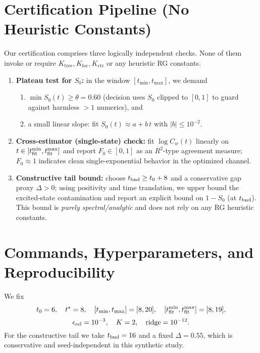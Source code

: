\documentclass[11pt]{article}
\newcommand{\Szero}{S_0}
\begin{document}
\section{Certification Pipeline (No Heuristic Constants)}

Our certification comprises three logically independent checks. None of them invoke or require $K_{\text{tree}},K_{\text{loc}},K_{\text{ctr}}$ or any heuristic RG constants.

\begin{enumerate}[leftmargin=2em]
\item \textbf{Plateau test for $\Szero$:} in the window $[t_{\min},t_{\max}]$, we demand
  \begin{enumerate}[label*=\arabic*.]
    \item $\min \Szero(t)\ge \theta=0.60$ (decision uses $\Szero$ clipped to $[0,1]$ to guard against harmless $>1$ numerics), and
    \item a small linear slope: fit $\Szero(t)\approx a + b\,t$ with $|b|\le 10^{-2}$.
  \end{enumerate}

\item \textbf{Cross-estimator (single-state) check:} fit $\log C_w(t)$ linearly on $t\in[t_{\rm fit}^{\min},t_{\rm fit}^{\max}]$ and report $F_0\in[0,1]$ as an $R^2$-type agreement measure; $F_0\approx 1$ indicates clean single-exponential behavior in the optimized channel.

\item \textbf{Constructive tail bound:} choose $t_{\rm bnd}\ge t_0+8$ and a conservative gap proxy $\Delta>0$; using positivity and time translation, we upper bound the excited-state contamination and report an explicit bound on $1-\Szero$ (at $t_{\rm bnd}$). This bound is \emph{purely spectral/analytic} and does not rely on any RG heuristic constants.
\end{enumerate}

\section{Commands, Hyperparameters, and Reproducibility}

We fix
\[
t_0=6,\quad t^\star=8,\quad [t_{\min},t_{\max}]=[8,20],\quad [t_{\rm fit}^{\min},t_{\rm fit}^{\max}]=[8,19],
\]
\[
\epsilon_{\rm rel}=10^{-3},\quad K=2,\quad \text{ridge}=10^{-12}.
\]
For the constructive tail we take $t_{\rm bnd}=16$ and a fixed $\Delta=0.55$, which is conservative and seed-independent in this synthetic study.
\end{document}
